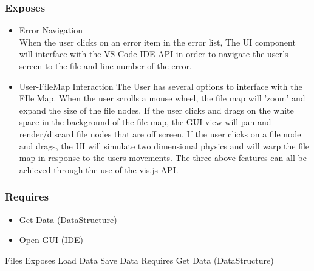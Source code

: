 \documentclass[letterpaper,10pt,titlepage,draftclsnofoot,onecolumn,onesided] {IEEEtran}
\begin{document}
		\subsubsection{Exposes}
		\begin{itemize}
			\item Error Navigation 
			\\
			When the user clicks on an error item in the error list, The UI component will interface with the VS Code IDE API in order to navigate the user's screen to the file and line number of the error.
			\item User-FileMap Interaction
			The User has several options to interface with the FIle Map. 
			When the user scrolls a mouse wheel, the file map will 'zoom' and expand the size of the file nodes.
			If the user clicks and drags on the white space in the background of the file map, the GUI view will pan and render/discard file nodes that are off screen.
			If the user clicks on a file node and drags, the UI will simulate two dimensional physics and will warp the file map in response to the users movements.
			The three above features can all be achieved through the use of the vis.js API.
		\end{itemize}
		\subsubsection{Requires}
		\begin{itemize}
			\item Get Data (DataStructure)
			\item Open GUI (IDE)
		\end{itemize}
		
	Files
		Exposes
			Load Data
			Save Data
		Requires
			Get Data (DataStructure)





\pagebreak


\end{document}
